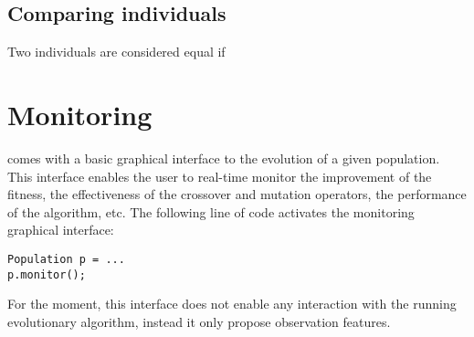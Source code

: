 \documentclass{article}
\begin{document}
\subsection{Comparing individuals}

Two individuals are considered equal if 



\section{Monitoring}

\drwin comes with a basic graphical interface to the evolution of a given
population. This interface enables the user to real-time monitor the improvement
of the fitness, the effectiveness of the crossover and mutation operators, the
performance of the algorithm, etc. The following line of code 
activates the monitoring graphical interface:
\begin{lstlisting}
Population p = ...
p.monitor();
\end{lstlisting}
For the moment, this interface does not enable any interaction with the running
evolutionary algorithm, instead it only propose observation features.
 



%
\end{document}
